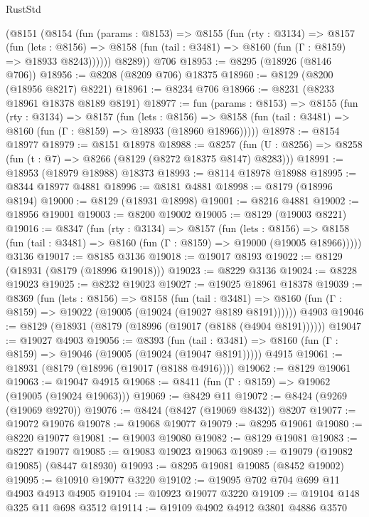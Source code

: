 \begin{lexlean}{RustStd}
\begin{coremodule}
      (@8151
        (@8154
          (fun (params : @8153) =>
          @8155
            (fun (rty : @3134) =>
            @8157
              (fun (lets : @8156) =>
              @8158 (fun (tail : @3481) => @8160 (fun (Γ : @8159) => @18933 @8243))))))
        @8289))
    @706
@18953 := @8295 (@18926 (@8146 @706))
@18956 := @8208 (@8209 @706) @18375
@18960 := @8129 (@8200 (@18956 @8217) @8221)
@18961 := @8234 @706
@18966 := @8231 (@8233 @18961 @18378 @8189 @8191)
@18977 := fun (params : @8153) =>
  @8155
    (fun (rty : @3134) =>
    @8157
      (fun (lets : @8156) =>
      @8158 (fun (tail : @3481) => @8160 (fun (Γ : @8159) => @18933 (@18960 @18966)))))
@18978 := @8154 @18977
@18979 := @8151 @18978
@18988 := @8257
    (fun (U : @8256) => @8258 (fun (t : @7) => @8266 (@8129 (@8272 @18375 @8147) @8283)))
@18991 := @18953 (@18979 @18988) @18373
@18993 := @8114 @18978 @18988
@18995 := @8344 @18977 @4881
@18996 := @8181 @4881
@18998 := @8179 (@18996 @8194)
@19000 := @8129 (@18931 @18998)
@19001 := @8216 @4881
@19002 := @18956 @19001
@19003 := @8200 @19002
@19005 := @8129 (@19003 @8221)
@19016 := @8347
    (fun (rty : @3134) =>
    @8157
      (fun (lets : @8156) =>
      @8158 (fun (tail : @3481) => @8160 (fun (Γ : @8159) => @19000 (@19005 @18966)))))
    @3136
@19017 := @8185 @3136
@19018 := @19017 @8193
@19022 := @8129 (@18931 (@8179 (@18996 @19018)))
@19023 := @8229 @3136
@19024 := @8228 @19023
@19025 := @8232 @19023
@19027 := @19025 @18961 @18378
@19039 := @8369
    (fun (lets : @8156) =>
    @8158
      (fun (tail : @3481) =>
      @8160 (fun (Γ : @8159) => @19022 (@19005 (@19024 (@19027 @8189 @8191))))))
    @4903
@19046 := @8129 (@18931 (@8179 (@18996 (@19017 (@8188 (@4904 @8191))))))
@19047 := @19027 @4903
@19056 := @8393
    (fun (tail : @3481) => @8160 (fun (Γ : @8159) => @19046 (@19005 (@19024 (@19047 @8191)))))
    @4915
@19061 := @18931 (@8179 (@18996 (@19017 (@8188 @4916))))
@19062 := @8129 @19061
@19063 := @19047 @4915
@19068 := @8411 (fun (Γ : @8159) => @19062 (@19005 (@19024 @19063)))
@19069 := @8429 @11
@19072 := @8424 (@9269 (@19069 @9270))
@19076 := @8424 (@8427 (@19069 @8432)) @8207
@19077 := @19072 @19076
@19078 := @19068 @19077
@19079 := @8295 @19061
@19080 := @8220 @19077
@19081 := @19003 @19080
@19082 := @8129 @19081
@19083 := @8227 @19077
@19085 := @19083 @19023 @19063
@19089 := @19079 (@19082 @19085) (@8447 @18930)
@19093 := @8295 @19081 @19085 (@8452 @19002)
@19095 := @10910 @19077 @3220
@19102 := @19095 @702 @704 @699 @11 @4903 @4913 @4905
@19104 := @10923 @19077 @3220
@19109 := @19104 @148 @325 @11 @698 @3512
@19114 := @19109 @4902 @4912 @3801 @4886 @3570

\end{coremodule}
\end{lexlean}

